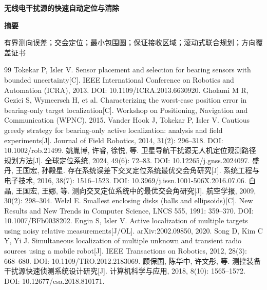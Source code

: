 \documentclass[UTF8,a4paper,zihao=-4,fontset=none]{ctexart}
\newcommand{\heifont}{\CJKfamily{paperhei}}
\newcommand{\papertitle}{无线电干扰源的快速自动定位与清除}
\newcommand{\paperkeywords}{有界测向误差；交会定位；最小包围圆；保证接收区域；滚动式联合规划；方向覆盖证书}
\begin{document}
\setcounter{page}{1}
\thispagestyle{fancy}

\begin{center}
  \vspace*{0.3cm}
  {\heifont\bfseries{}\papertitle\par}
  \vspace{1.5\baselineskip}
  {\heifont\bfseries{}摘要\par}
\end{center}



\vspace{0.5\baselineskip}
\noindent{\heifont\bfseries 关键词：}\paperkeywords

\newpage












\begin{thebibliography}{99}
   Tokekar P, Isler V. Sensor placement and selection for bearing sensors with bounded uncertainty[C]. IEEE International Conference on Robotics and Automation (ICRA), 2013. DOI: 10.1109/ICRA.2013.6630920.
   Gholami M R, Gezici S, Wymeersch H, et al. Characterizing the worst-case position error in bearing-only target localization[C]. Workshop on Positioning, Navigation and Communication (WPNC), 2015.
   Vander Hook J, Tokekar P, Isler V. Cautious greedy strategy for bearing-only active localization: analysis and field experiments[J]. Journal of Field Robotics, 2014, 31(2): 296--318. DOI: 10.1002/rob.21499.
   姚胤博, 许睿, 徐悦, 等. 卫星导航干扰源无人机定位观测路径规划方法[J]. 全球定位系统, 2024, 49(6): 72--83. DOI: 10.12265/j.gnss.2024097.
   盛丹, 王国宏, 孙殿星. 存在系统误差下交叉定位系统最优交会角研究[J]. 系统工程与电子技术, 2016, 38(7): 1516--1523. DOI: 10.3969/j.issn.1001-506X.2016.07.06.
   白晶, 王国宏, 王娜, 等. 测向交叉定位系统中的最优交会角研究[J]. 航空学报, 2009, 30(2): 298--304.
   Welzl E. Smallest enclosing disks (balls and ellipsoids)[C]. New Results and New Trends in Computer Science, LNCS 555, 1991: 359--370. DOI: 10.1007/BFb0038202.
   Engin S, Isler V. Active localization of multiple targets using noisy relative measurements[J/OL]. arXiv:2002.09850, 2020.
   Song D, Kim C Y, Yi J. Simultaneous localization of multiple unknown and transient radio sources using a mobile robot[J]. IEEE Transactions on Robotics, 2012, 28(3): 668--680. DOI: 10.1109/TRO.2012.2183069.
   顾保国, 陈华中, 许文彤, 等. 测控装备干扰源快速侦测系统设计研究[J]. 计算机科学与应用, 2018, 8(10): 1565--1572. DOI: 10.12677/csa.2018.810171.
\end{thebibliography}
\end{document}
